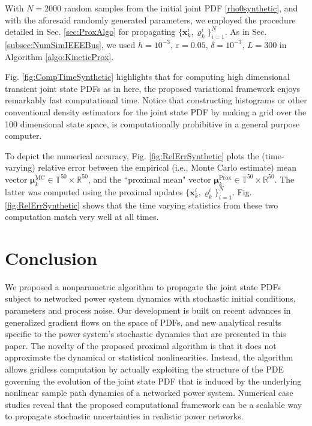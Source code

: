 \documentclass[10pt,twocolumn]{IEEEtran}
\begin{document}
With $N=2000$ random samples from the initial joint PDF \eqref{rho0synthetic}, and with the aforesaid randomly generated parameters, we employed the procedure detailed in Sec. \ref{sec:ProxAlgo} for propagating $\{\bm{x}_{k}^{i},\varrho_{k}^{i}\}_{i=1}^{N}$. As in Sec. \ref{subsec:NumSimIEEEBus}, we used $h=10^{-3}$, $\varepsilon = 0.05$, $\delta = 10^{-3}$, $L = 300$ in Algorithm \ref{algo:KineticProx}.

Fig. \ref{fig:CompTimeSynthetic} highlights that for computing high dimensional transient joint state PDFs as in here, the proposed variational framework enjoys remarkably fast computational time. Notice that constructing histograms or other conventional density estimators for the joint state PDF by making a grid over the 100 dimensional state space, is computationally prohibitive in a general purpose computer. 

To depict the numerical accuracy, Fig. \ref{fig:RelErrSynthetic} plots the (time-varying) relative error between the empirical (i.e., Monte Carlo estimate) mean vector $\bm{\mu}_{k}^{\text{MC}}\in\mathbb{T}^{50}\times\mathbb{R}^{50}$, and the ``proximal mean" vector $\bm{\mu}_{k}^{\text{Prox}}\in\mathbb{T}^{50}\times\mathbb{R}^{50}$. The latter was computed using the proximal updates $\{\bm{x}_{k}^{i},\varrho_{k}^{i}\}_{i=1}^{N}$. Fig. \ref{fig:RelErrSynthetic} shows that the time varying statistics from these two computation match very well at all times.





\section{Conclusion}\label{sec:conclusion}
We proposed a nonparametric algorithm to propagate the joint state PDFs subject to networked power system dynamics with stochastic initial conditions, parameters and process noise. Our development is built on recent advances in generalized gradient flows on the space of PDFs, and new analytical results specific to the power system's stochastic dynamics that are presented in this paper. The novelty of the proposed proximal algorithm is that it does not approximate the dynamical or statistical nonlinearities. Instead, the algorithm allows gridless computation by actually exploiting the structure of the PDE governing the evolution of the joint state PDF that is induced by the underlying nonlinear sample path dynamics of a networked power system. Numerical case studies reveal that the proposed computational framework can be a scalable way to propagate stochastic uncertainties in realistic power networks.
\end{document}
